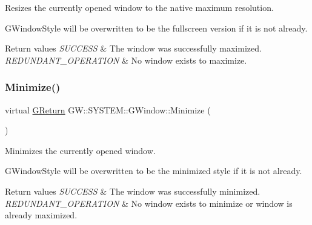 Resizes the currently opened window to the native maximum resolution. 

G\+Window\+Style will be overwritten to be the fullscreen version if it is not already.


\begin{DoxyRetVals}{Return values}
{\em S\+U\+C\+C\+E\+SS} & The window was successfully maximized. \\
\hline
{\em R\+E\+D\+U\+N\+D\+A\+N\+T\+\_\+\+O\+P\+E\+R\+A\+T\+I\+ON} & No window exists to maximize. \\
\hline
\end{DoxyRetVals}
\mbox{\label{classGW_1_1SYSTEM_1_1GWindow_a2cced61a323dac10535904c3899563d8}} 
\subsubsection{\texorpdfstring{Minimize()}{Minimize()}}
{\footnotesize\ttfamily virtual \mbox{\hyperlink{namespaceGW_a67a839e3df7ea8a5c5686613a7a3de21}{G\+Return}} G\+W\+::\+S\+Y\+S\+T\+E\+M\+::\+G\+Window\+::\+Minimize (\begin{DoxyParamCaption}{ }\end{DoxyParamCaption})\hspace{0.3cm}{\ttfamily [pure virtual]}}



Minimizes the currently opened window. 

G\+Window\+Style will be overwritten to be the minimized style if it is not already.


\begin{DoxyRetVals}{Return values}
{\em S\+U\+C\+C\+E\+SS} & The window was successfully minimized. \\
\hline
{\em R\+E\+D\+U\+N\+D\+A\+N\+T\+\_\+\+O\+P\+E\+R\+A\+T\+I\+ON} & No window exists to minimize or window is already maximized. \\
\hline
\end{DoxyRetVals}
\mbox{\label{classGW_1_1SYSTEM_1_1GWindow_a9fc043b893f26c35e6ba965adcc17edb}} 
